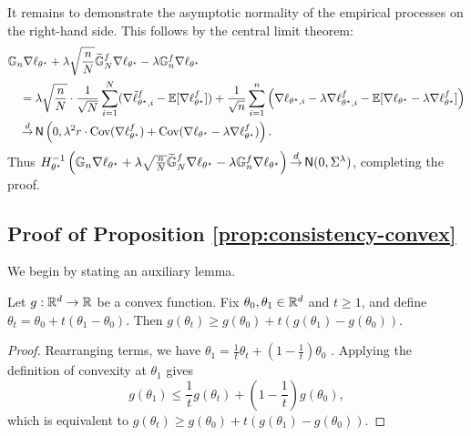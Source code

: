 It remains to demonstrate the asymptotic normality of the empirical
processes on the right-hand side. This follows by the central limit theorem:
\begin{align*}
&\mathbb{G}_n \nabla\ell_{\theta^\star} + \lambda \sqrt{\frac{n}{N}} \widetilde {\mathbb{G}}_N^f \nabla\ell_{\theta^\star} - \lambda \mathbb{G}_n^f \nabla\ell_{\theta^\star}\\
&\quad = \lambda \sqrt{\frac{n}{N}} \cdot \frac{1}{\sqrt{N}} \sum_{i=1}^N (\nabla \tilde {\ell}_{\theta^\star,i}^f - \mathbb{E}[ \nabla \ell_{\theta^\star}^f])  + \frac{1}{\sqrt n} \sum_{i=1}^n \left( \nabla \ell_{\theta^\star,i} - \lambda \nabla \ell_{\theta^\star,i}^f - \mathbb{E}[\nabla \ell_{\theta^\star} -  \lambda\nabla \ell_{\theta^\star}^f]\right)\\
&\quad \mathop{\stackrel{d}{\rightarrow}} \mathsf{N} \left(0, \lambda^2 r \cdot \textup{Cov}(\nabla \ell_{\theta^\star}^f) + \textup{Cov}(\nabla \ell_{\theta^\star} - \lambda\nabla \ell_{\theta^\star}^f)\right).
\end{align*}
Thus $H_{\theta^\star}^{-1} \left(\mathbb{G}_n \nabla\ell_{\theta^\star} + \lambda
\sqrt{\frac{n}{N}} \widetilde {\mathbb{G}}_N^f \nabla\ell_{\theta^\star} - \lambda
\mathbb{G}_n^f \nabla\ell_{\theta^\star}\right)\mathop{\stackrel{d}{\rightarrow}} \mathsf{N}(0,\Sigma^\lambda)$,
completing the proof.

\subsection{Proof of Proposition \ref{prop:consistency-convex}}
\label{sec:proof-consistency-convex}

We begin by stating an auxiliary lemma.

\begin{lemma}
  \label{lemma:convexity_growth}
  Let $g:\mathbb{R}^d\to\mathbb{R}$ be a convex function. Fix $\theta_0,\theta_1\in\mathbb{R}^d$ and
  $t\geq 1$, and define $\theta_t = \theta_0 + t(\theta_1 - \theta_0)$. Then
  $g(\theta_t) \geq g(\theta_0) + t(g(\theta_1) - g(\theta_0))$.
\end{lemma}
\begin{proof}
  Rearranging terms, we have $\theta_1 = \frac 1 t \theta_t + (1 - \frac 1
  t)\theta_0$ . Applying the definition of convexity at $\theta_1$ gives
  \[g(\theta_1) \leq \frac 1 t g(\theta_t) + \left(1-\frac 1 t \right)g(\theta_0),\]
  which is equivalent to $g(\theta_t) \geq g(\theta_0) + t(g(\theta_1) - g(\theta_0))$.
\end{proof}

